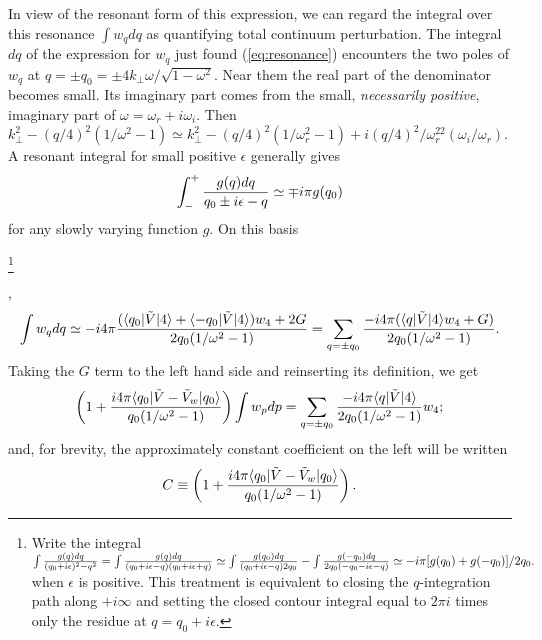 \documentclass[12pt]{article}
\def\ket#1{|#1\rangle}
\def\bra#1{\langle#1}
\begin{document}
In view of the resonant form of this expression, we can regard the
integral over this resonance $\int w_q dq$ as quantifying total
continuum perturbation.  The integral $dq$ of the expression for $w_q$
just found (\ref{eq:resonance}) encounters the two poles of $w_q$ at
$q=\pm q_0=\pm4k_\perp\omega/\sqrt{1-\omega^2}$. Near them the real
part of the denominator becomes small. Its imaginary part comes from
the small, \emph{necessarily positive}, imaginary part of
$\omega=\omega_r+i\omega_i$. Then
$k_\perp^2-(q/4)^2(1/\omega^2-1)\simeq k_\perp^2-(q/4)^2(1/\omega_r^2-1)
+i(q/4)^2/\omega_r^22(\omega_i/\omega_r)$.  A resonant integral for small
positive $\epsilon$ generally gives
\begin{equation}
  \label{resint}
  \int_{-}^{+} {g(q) dq\over q_0\pm i\epsilon-q}\simeq \mp i\pi g(q_0)
\end{equation}
for any slowly varying function $g$. On this basis
\iftrue
\footnote{Write the integral $\int{g(q)dq\over
  (q_0+i\epsilon)^2-q^2}=\int{g(q)dq\over 
(q_0+i\epsilon-q)(q_0+i\epsilon+q)}\simeq \int{g(q_0)dq\over
  (q_0+i\epsilon-q)2q_0}-\int{g(-q_0)dq\over
  2q_0(-q_0-i\epsilon-q) }\simeq -i\pi [g(q_0)+g(-q_0)]/2q_0. $ when
 $\epsilon$ is
positive. This treatment is equivalent to closing the $q$-integration path
along $+i\infty$ and setting the closed contour integral equal to
$2\pi i$ times only the residue at $q=q_0+i\epsilon$.}
\fi
,
\begin{equation}
  \label{poles}
  \int w_q dq \simeq -i4\pi {(\bra{q_0}|\tilde{V}\ket{4}
    +\bra{-q_0}|\tilde{V}\ket{4})w_4+2G
    \over
    2q_0(1/\omega^2-1)
  }
  =\sum_{q=\pm q_0}{-i4\pi(\bra{q}|\tilde{V}\ket{4}w_4+G)
    \over
    2q_0(1/\omega^2-1)}.
\end{equation}
Taking the $G$ term to the left hand side and reinserting its definition, we get
\begin{equation}
  \label{eq:22}
\left(1+{i4\pi \bra{q_0}|\tilde{V}-\tilde{V}_{w}\ket{q_0}\over q_0(1/\omega^2-1)}\right)\int w_pdp  =\sum_{q=\pm q_0}{-i4\pi\bra{q}|\tilde{V}\ket{4}  \over
    2q_0(1/\omega^2-1)}w_4;
\end{equation}
and, for brevity, the approximately constant coefficient on the left will
be written
\begin{equation}
  \label{eq:23}
  C \equiv \left(1+{i4\pi\bra{q_0}|\tilde{V}-\tilde{V}_{w}\ket{q_0}\over q_0(1/\omega^2-1)}\right).
\end{equation}
\end{document}

